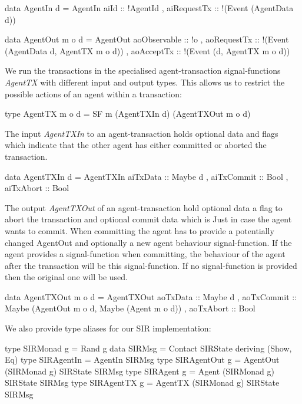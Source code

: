 \begin{HaskellCode}
data AgentIn d = AgentIn
  { aiId        :: !AgentId
  , aiRequestTx :: !(Event (AgentData d))}

data AgentOut m o d = AgentOut
  { aoObservable :: !o
  , aoRequestTx  :: !(Event (AgentData d, AgentTX m o d))
  , aoAcceptTx   :: !(Event (d, AgentTX m o d))}
\end{HaskellCode}

We run the transactions in the specialised agent-transaction signal-functions \textit{AgentTX} with different input and output types. This allows us to restrict the possible actions of an agent within a transaction:

\begin{HaskellCode}
type AgentTX m o d = SF m (AgentTXIn d) (AgentTXOut m o d)
\end{HaskellCode}

The input \textit{AgentTXIn} to an agent-transaction holds optional data and flags which indicate that the other agent has either committed or aborted the transaction.

\begin{HaskellCode}
data AgentTXIn d = AgentTXIn
  { aiTxData   :: Maybe d
  , aiTxCommit :: Bool
  , aiTxAbort  :: Bool
  }
\end{HaskellCode}

The output \textit{AgentTXOut} of an agent-transaction hold optional data a flag to abort the transaction and optional commit data which is Just in case the agent wants to commit. When committing the agent has to provide a potentially changed AgentOut and optionally a new agent behaviour signal-function. If the agent provides a signal-function when committing, the behaviour of the agent after the transaction will be this signal-function. If no signal-function is provided then the original one will be used.

\begin{HaskellCode}
data AgentTXOut m o d = AgentTXOut
  { aoTxData   :: Maybe d
  , aoTxCommit :: Maybe (AgentOut m o d, Maybe (Agent m o d))
  , aoTxAbort  :: Bool
  }
\end{HaskellCode}

We also provide type aliases for our SIR implementation:
\begin{HaskellCode}
type SIRMonad g    = Rand g
data SIRMsg        = Contact SIRState deriving (Show, Eq)
type SIRAgentIn    = AgentIn SIRMsg
type SIRAgentOut g = AgentOut (SIRMonad g) SIRState SIRMsg
type SIRAgent g    = Agent (SIRMonad g) SIRState SIRMsg
type SIRAgentTX g  = AgentTX (SIRMonad g) SIRState SIRMsg
\end{HaskellCode}

